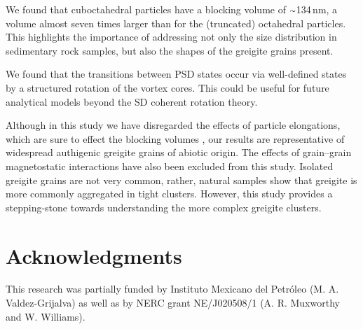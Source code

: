 \documentclass[review,authoryear]{elsarticle}
\newcommand{\roughly}{{\raise.17ex\hbox{$\scriptstyle\sim$}}}
\newcommand{\nm}{\,\text{nm}}
\begin{document}
We found that cuboctahedral particles have a blocking volume of $\roughly$134$\nm$, a volume almost seven times larger than for the (truncated) octahedral particles. This highlights the importance of addressing not only the size distribution in sedimentary rock samples, but also the shapes of the greigite grains present.\par
We found that the transitions between PSD states occur via well-defined states by a structured rotation of the vortex cores. This could be useful for future analytical models beyond the SD coherent rotation theory.\par

Although in this study we have disregarded the effects of particle elongations, which are sure to effect the blocking volumes \citep{Muxworthy2013}, our results are representative of widespread authigenic greigite grains of abiotic origin. The effects of grain--grain magnetostatic interactions have also been excluded from this study. Isolated greigite grains are not very common, rather, natural samples show that greigite is more commonly aggregated in tight clusters. However, this study provides a stepping-stone towards understanding the more complex greigite clusters.\par

\section*{Acknowledgments}
This research was partially funded by Instituto Mexicano del Petr\'oleo (M. A. Valdez-Grijalva) as well as by NERC grant NE/J020508/1 (A. R. Muxworthy and W. Williams).\par

\def\urlprefix{}

\newpage
\end{document}

